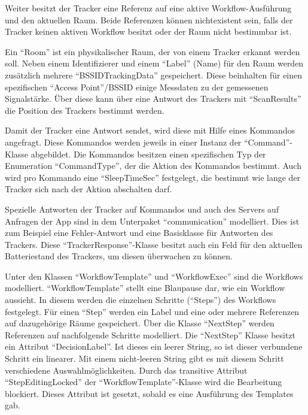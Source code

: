 Weiter besitzt der Tracker eine Referenz auf eine aktive Workflow-Ausführung und den aktuellen Raum.
Beide Referenzen können nichtexistent sein, falls der Tracker keinen aktiven Workflow besitzt oder der Raum nicht bestimmbar ist.

Ein \enquote{Room} ist ein physikalischer Raum, der von einem Tracker erkannt werden soll.
Neben einem Identifizierer und einem \enquote{Label} (Name) für den Raum werden zusätzlich mehrere \enquote{BSSIDTrackingData} gespeichert.
Diese beinhalten für einen spezifischen \enquote{Access Point}/\gls{BSSID} einige Messdaten zu der gemessenen Signalstärke.
Über diese kann über eine Antwort des Trackers mit \enquote{ScanResults} die Position des Trackers bestimmt werden.

Damit der Tracker eine Antwort sendet, wird diese mit Hilfe eines Kommandos angefragt.
Diese Kommandos werden jeweils in einer Instanz der \enquote{Command}-Klasse abgebildet.
Die Kommandos besitzen einen spezifischen Typ der Enumeration \enquote{CommandType}, der die Aktion des Kommandos bestimmt.
Auch wird pro Kommando eine \enquote{SleepTimeSec} festgelegt, die bestimmt wie lange der Tracker sich nach der Aktion abschalten darf.

Spezielle Antworten der Tracker auf Kommandos und auch des Servers auf Anfragen der App sind in dem Unterpaket \enquote{communication} modelliert.
Dies ist zum Beispiel eine Fehler-Antwort und eine Basisklasse für Antworten des Trackers.
Diese \enquote{TrackerResponse}-Klasse besitzt auch ein Feld für den aktuellen Batteriestand des Trackers, um diesen überwachen zu können.

Unter den Klassen \enquote{WorkflowTemplate} und \enquote{WorkflowExec} sind die Workflows modelliert.
\enquote{WorkflowTemplate} stellt eine Blaupause dar, wie ein Workflow aussieht.
In diesem werden die einzelnen Schritte (\enquote{Steps}) des Workflows festgelegt.
Für einen \enquote{Step} werden ein Label und eine oder mehrere Referenzen auf dazugehörige Räume gespeichert.
Über die Klasse \enquote{NextStep} werden Referenzen auf nachfolgende Schritte modelliert.
Die \enquote{NextStep} Klasse besitzt ein Attribut \enquote{DecisionLabel}.
Ist dieses ein leerer String, so ist dieser verbundene Schritt ein linearer.
Mit einem nicht-leeren String gibt es mit diesem Schritt verschiedene Auswahlmöglichkeiten.
Durch das transitive Attribut \enquote{StepEditingLocked} der \enquote{WorkflowTemplate}-Klasse wird die Bearbeitung blockiert.
Dieses Attribut ist gesetzt, sobald es eine Ausführung des Templates gab.


